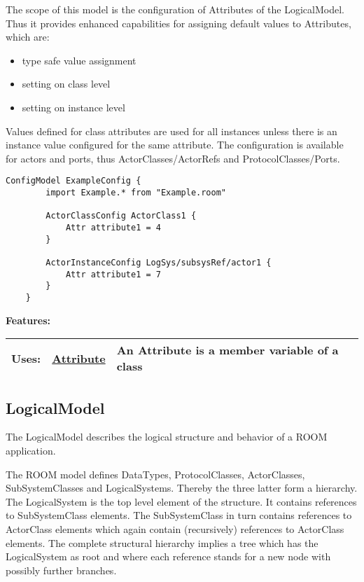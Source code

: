	The scope of this model is the configuration of Attributes of the LogicalModel.
	Thus it provides enhanced capabilities for assigning default values to Attributes, which are:
	\begin{itemize}
		\item type safe value assignment
		\item setting on class level
		\item setting on instance level
	\end{itemize}
	Values defined for class attributes are used for all instances unless there is an instance value configured for the same attribute.
	The configuration is available for actors and ports, thus ActorClasses/ActorRefs and ProtocolClasses/Ports.
	
	\begin{lstlisting}[language=Config]
	ConfigModel ExampleConfig {
		import Example.* from "Example.room"
	
		ActorClassConfig ActorClass1 {
			Attr attribute1 = 4
		}
	
		ActorInstanceConfig LogSys/subsysRef/actor1 {
			Attr attribute1 = 7
		}
	}
	\end{lstlisting}
		
		
	\begingroup
	\textbf{Features:}
	\renewcommand{\arraystretch}{1.8} %
	\begin{longtable}{l|l p{}}
		\hline
	Uses: & \tabitem \hyperlink{ref:Attribute}{Attribute}  & An Attribute is a member variable of a class\\
	\hline
	\end{longtable}
	\endgroup
		
		
	
	\vspace{\baselineskip}
	\vspace{\baselineskip}
	\vspace{\baselineskip}
	
\subsection{LogicalModel}
	\hypertarget{ref:LogicalModel}{}
	The LogicalModel describes the logical structure and behavior of a ROOM application.
		
	The ROOM model defines DataTypes, ProtocolClasses, ActorClasses, SubSystemClasses and LogicalSystems.
	Thereby the three latter form a hierarchy. The LogicalSystem is the top level element of the structure. 
	It contains references to SubSystemClass elements. The SubSystemClass in turn contains 
	references to ActorClass elements which again contain (recursively) references to 
	ActorClass elements. The complete structural hierarchy implies a tree which has the 
	LogicalSystem as root and where each reference stands for a new node with possibly further 
	branches.
		
